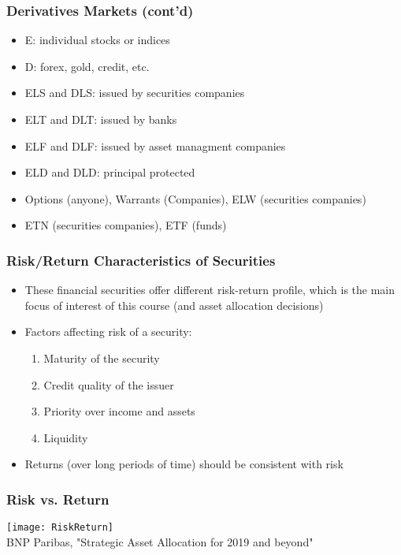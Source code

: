 \documentclass[10pt]{beamer}
\begin{document}
	
	\begin{frame}
		\frametitle{Derivatives Markets (cont'd)}
		
		\begin{itemize}
			
			\item E: individual stocks or indices
			\item D: forex, gold, credit, etc.
			\vspace{5mm}
			\item ELS and DLS: issued by securities companies
			\item ELT and DLT: issued by banks
			\item ELF and DLF: issued by asset managment companies
			\item ELD and DLD: principal protected
			\item Options (anyone), Warrants (Companies), ELW (securities companies)
			\item ETN (securities companies), ETF (funds)
			
			
		\end{itemize}
		
		
	\end{frame}


	\begin{frame}
		\frametitle{Risk/Return Characteristics of Securities}
		
		\begin{itemize} \vspace{5pt} \itemsep10pt
			\item These financial securities offer different risk-return profile, which is the main focus of interest of this course (and asset allocation decisions)
			\item Factors affecting risk of a security:
			\begin{enumerate} \vspace{5pt} \itemsep10pt
				\item Maturity of the security
				\item Credit quality of the issuer
				\item Priority over income and assets
				\item Liquidity
			\end{enumerate}
			\item Returns (over long periods of time) should be consistent with risk
		\end{itemize}
		
	\end{frame}
	
	
	
	\begin{frame}
		\frametitle{Risk vs. Return}
		
		\begin{center}
			\texttt{[image: RiskReturn]} \\
			{\scriptsize BNP Paribas, "Strategic Asset Allocation for 2019 and beyond"}
		\end{center}
		
	\end{frame}
	
	
	
	
\end{document}
